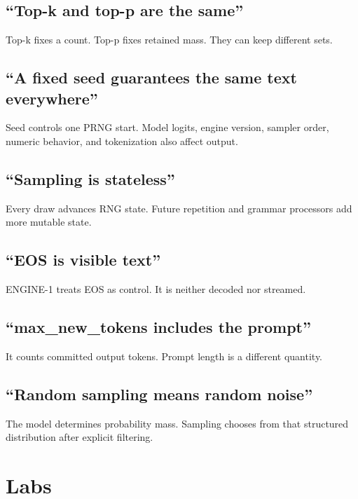 \subsection{``Top-k and top-p are the
same''}\label{top-k-and-top-p-are-the-same}

Top-k fixes a count. Top-p fixes retained mass. They can keep different
sets.

\subsection{``A fixed seed guarantees the same text
everywhere''}\label{a-fixed-seed-guarantees-the-same-text-everywhere}

Seed controls one PRNG start. Model logits, engine version, sampler
order, numeric behavior, and tokenization also affect output.

\subsection{``Sampling is stateless''}\label{sampling-is-stateless}

Every draw advances RNG state. Future repetition and grammar processors
add more mutable state.

\subsection{``EOS is visible text''}\label{eos-is-visible-text}

ENGINE-1 treats EOS as control. It is neither decoded nor streamed.

\subsection{``max\_new\_tokens includes the
prompt''}\label{max_new_tokens-includes-the-prompt}

It counts committed output tokens. Prompt length is a different
quantity.

\subsection{``Random sampling means random
noise''}\label{random-sampling-means-random-noise}

The model determines probability mass. Sampling chooses from that
structured distribution after explicit filtering.

\section{Labs}\label{labs}

